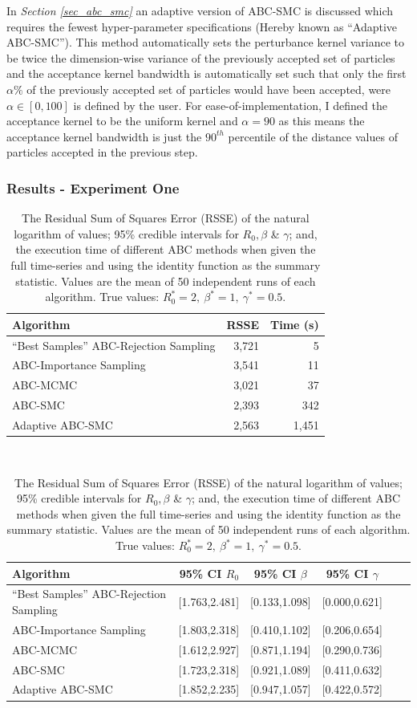 \documentclass[11pt,a4paper]{article}
\theoremstyle{break}
\begin{document}
  \par In \textit{Section \ref{sec_abc_smc}} an adaptive version of ABC-SMC is discussed which requires the fewest hyper-parameter specifications (Hereby known as ``Adaptive ABC-SMC''). This method automatically sets the perturbance kernel variance to be twice the dimension-wise variance of the previously accepted set of particles and the acceptance kernel bandwidth is automatically set such that only the first $\alpha\%$ of the previously accepted set of particles would have been accepted, were $\alpha\in[0,100]$ is defined by the user. For ease-of-implementation, I defined the acceptance kernel to be the uniform kernel and $\alpha=90$ as this means the acceptance kernel bandwidth is just the $90^{th}$ percentile of the distance values of particles accepted in the previous step.

\subsubsection*{Results - Experiment One}

  \begin{table}[H]
    \begin{tabular}{|l|r|r|}
      \hline
      \textbf{Algorithm}&\textbf{RSSE}&\textbf{Time (s)}\\\hline\hline
      ``Best Samples'' ABC-Rejection Sampling&3,721&5\\\hline
      ABC-Importance Sampling&3,541&11\\\hline
      ABC-MCMC&3,021&37\\\hline
      ABC-SMC&2,393&342\\\hline
      Adaptive ABC-SMC&2,563&1,451\\\hline
    \end{tabular}\\
    \bigskip
    \begin{tabular}{|l|r|c|c|c|r|}
      \hline
      \textbf{Algorithm}&\textbf{95\% CI $R_0$}&\textbf{95\% CI $\beta$}&\textbf{95\% CI $\gamma$}\\\hline\hline
      ``Best Samples'' ABC-Rejection Sampling&[1.763,2.481]&[0.133,1.098]&[0.000,0.621]\\\hline
      ABC-Importance Sampling&[1.803,2.318]&[0.410,1.102]&[0.206,0.654]\\\hline
      ABC-MCMC&[1.612,2.927]&[0.871,1.194]&[0.290,0.736]\\\hline
      ABC-SMC&[1.723,2.318]&[0.921,1.089]&[0.411,0.632]\\\hline
      Adaptive ABC-SMC&[1.852,2.235]&[0.947,1.057]&[0.422,0.572]\\\hline
    \end{tabular}
    \caption{The Residual Sum of Squares Error (RSSE) of the natural logarithm of values; 95\% credible intervals for $R_0,\beta$ \& $\gamma$; and, the execution time of different ABC methods when given the full time-series and using the identity function as the summary statistic. Values are the mean of 50 independent runs of each algorithm. True values: $R_0^*=2,\ \beta^*=1,\ \gamma^*=0.5$.}
    \label{table_abc_methods_on_sir_model}
  \end{table}
\end{document}
